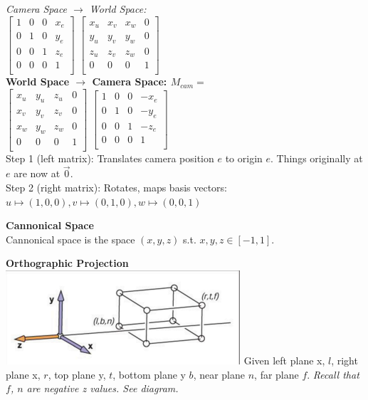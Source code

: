 \documentclass[letterpaper, 8pt]{extarticle}
\begin{document}
\begin{multicols*}{4}
\textit{Camera Space $\to$ World Space:}\\
\(
\begin{bmatrix}
    1 & 0 & 0 & x_e \\
    0 & 1 & 0 & y_e \\
    0 & 0 & 1 & z_e \\
    0 & 0 & 0 & 1   \\
\end{bmatrix}
\)
\(
\begin{bmatrix}
    x_u & x_v & x_w & 0 \\
    y_u & y_v & y_w & 0 \\
    z_u & z_v & z_w & 0 \\
    0   & 0   & 0   & 1 \\
\end{bmatrix}
\)\\

\textbf{World Space $\to$ Camera Space: $M_{cam}=$}\\
\(
\begin{bmatrix}
    x_u & y_u & z_u & 0 \\
    x_v & y_v & z_v & 0 \\
    x_w & y_w & z_w & 0 \\
    0   & 0   & 0   & 1 \\
\end{bmatrix}
\)
\(
\begin{bmatrix}
    1 & 0 & 0 & -x_e \\
    0 & 1 & 0 & -y_e \\
    0 & 0 & 1 & -z_e \\
    0 & 0 & 0 & 1    \\
\end{bmatrix}
\)
\\
Step 1 (left matrix): Translates camera position $e$ to origin $e$. Things originally at $e$ are now at $\vec{0}$.\\
Step 2 (right matrix): Rotates, maps basis vectors: $u \mapsto (1,0,0), v \mapsto (0,1,0), w \mapsto (0,0,1)$

\textbf{Cannonical Space}\\
Cannonical space is the space $(x, y, z)$ s.t. $x,y,z \in [-1, 1]$.

\textbf{Orthographic Projection}\\

\includegraphics[width=\linewidth]{cam-ortho.png}
Given left plane x, $l$, right plane x, $r$, top plane y, $t$, bottom plane y $b$, near plane $n$, far plane $f$.
\textit{Recall that $f$, $n$ are negative z values. See diagram.}


\end{multicols*}
\end{document}
